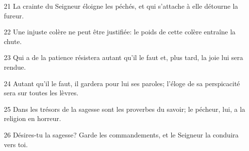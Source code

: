 
21 La crainte du Seigneur éloigne les péchés, et qui s’attache à elle détourne la fureur.

22 Une injuste colère ne peut être justifiée: le poids de cette colère entraîne la chute.

23 Qui a de la patience résistera autant qu’il le faut et, plus tard, la joie lui sera rendue.

24 Autant qu’il le faut, il gardera pour lui ses paroles; l’éloge de sa perspicacité sera sur toutes les lèvres.

25 Dans les trésors de la sagesse sont les proverbes du savoir; le pécheur, lui, a la religion en horreur.

26 Désires-tu la sagesse? Garde les commandements, et le Seigneur la conduira vers toi.
